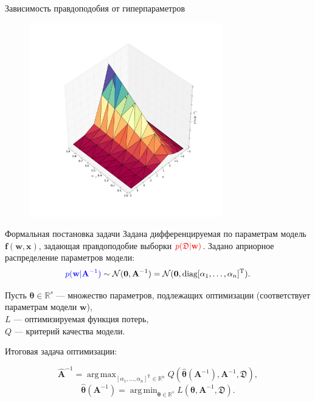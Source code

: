 \documentclass[11pt,pdf,utf8,russian,aspectratio=169]{beamer}
\DeclareMathOperator*{\argmin}{arg\,min}
\DeclareMathOperator*{\argmax}{arg\,max}
\begin{document}
\begin{frame}{Зависимость правдоподобия от гиперпараметров}
           
\begin{figure}[h]                                                                                                                               
\centering  
   \includegraphics[width=0.75\textwidth]{./slide_plots/hyper.png}
\end{figure}
\end{frame}


\begin{frame}{Формальная постановка задачи}
Задана дифференцируемая по параметрам модель $\mathbf{f}(\mathbf{w}, \mathbf{x})$, задающая правдоподобие выборки $\textcolor{red}{p(\mathfrak{D}| \mathbf{w})}$.
Задано априорное распределение параметров модели:
\[
    \textcolor{blue}{p(\mathbf{w}|\mathbf{A}^{-1}) }\sim \mathcal{N}(\mathbf{0}, \mathbf{A}^{-1}) = \mathcal{N}(\mathbf{0}, \text{diag} [\alpha_1, \dots, \alpha_n]^\text{T}).
\]

Пусть $\boldsymbol{\theta}  \in \mathbb{R}^s$ --- множество параметров, подлежащих оптимизации (соответствует параметрам модели $\mathbf{w}$), \\
$L$ --- оптимизируемая функция потерь, \\$Q$ --- критерий качества модели.


Итоговая задача оптимизации:

\[
	\hat{\mathbf{A}}^{-1} = \argmax_{[\alpha_1, \dots, \alpha_n]^\text{T} \in \mathbb{R}^n} Q(\hat{\boldsymbol{\theta}}(\mathbf{A}^{-1}), \mathbf{A}^{-1}, \mathfrak{D}),
\]
\[
	\hat{\boldsymbol{\theta}}(\mathbf{A}^{-1}) =  \argmin_{\boldsymbol{\theta} \in \mathbb{R}^s} L(\boldsymbol{\theta}, \mathbf{A}^{-1}, \mathfrak{D}).
\]


\end{frame}
\end{document}
